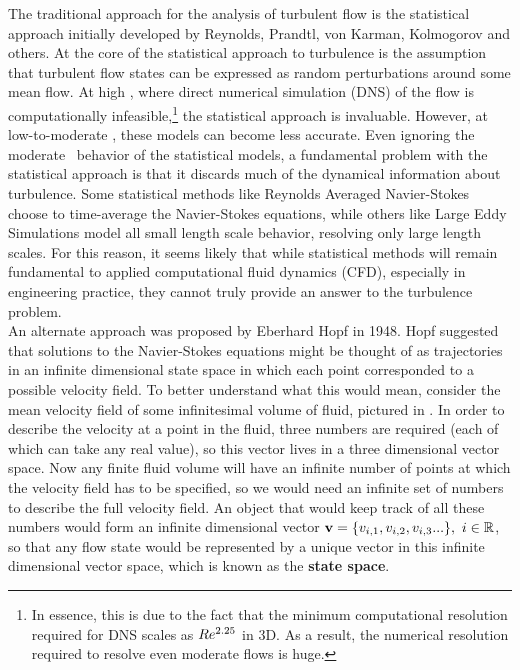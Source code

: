 The traditional approach for the analysis of turbulent flow is the statistical approach initially developed by Reynolds, Prandtl, von Karman, Kolmogorov and others. At the core of the statistical approach to turbulence is the assumption that turbulent flow states can be expressed as random perturbations around some mean flow. At high \ReN, where direct numerical simulation (DNS) of the flow is computationally infeasible,\footnote{In essence, this is due to the fact that the minimum computational resolution required for DNS scales as $Re^{2.25}$ in 3D. As a result, the numerical resolution required to resolve even moderate \ReN flows is huge.}  the statistical approach is invaluable. However, at low-to-moderate \ReN, these models can become less accurate. Even ignoring the moderate \ReN\ behavior of the statistical models, a fundamental problem with the statistical approach is that it discards much of the dynamical information about turbulence. Some statistical methods like Reynolds Averaged Navier-Stokes choose to time-average the Navier-Stokes equations, while others like Large Eddy Simulations model all small length scale behavior, resolving only large length scales. For this reason, it seems likely that while statistical methods will remain fundamental to applied computational fluid dynamics (CFD), especially in engineering practice, they cannot truly provide an answer to the turbulence problem. \\

An alternate approach was proposed by Eberhard Hopf in 1948. Hopf suggested that solutions to the Navier-Stokes equations might be thought of as trajectories in an infinite dimensional state space in which each point corresponded to a possible velocity field. To better understand what this would mean, consider the mean velocity field of some infinitesimal volume of fluid, pictured in . In order to describe the velocity at a point in the fluid, three numbers are required (each of which can take any real value), so this vector lives in a three dimensional vector space. Now any finite fluid volume will have an infinite number of points at which the velocity field has to be specified, so we would need an infinite set of numbers to describe the full velocity field. An object that would keep track of all these numbers would form an infinite dimensional vector $\mathbf{v} = \{v_{i,1},v_{i,2},v_{i,3}...\},~i \in \mathbb{R}$, so that any flow state would be represented by a unique vector in this infinite dimensional vector space, which is known as the {\bf state space}. 


